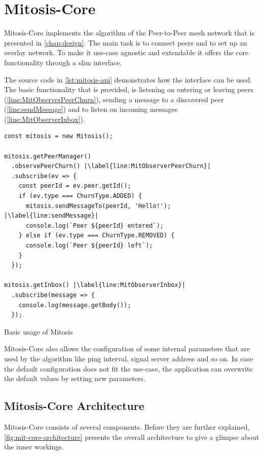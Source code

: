 \section{Mitosis-Core}
Mitosis-Core implements the algorithm of the Peer-to-Peer mesh network that is presented in \vref{chap:design}. The main task is to connect peers and to set up an overlay network. To make it use-case agnostic and extendable it offers the core functionality through a slim interface.

The source code in \vref{lst:mitosis-api} demonstrates how the interface can be used.
The basic functionality that is provided, is listening on entering or leaving peers (\cref{line:MitObserverPeerChurn}), sending a message to a discovered peer (\cref{line:sendMessage}) and to listen on incoming messages (\cref{line:MitObserverInbox}).

\begin{Listing}[htb!]
\begin{lstlisting}[basicstyle=\tiny,basicstyle=\footnotesize\ttfamily,xleftmargin=3em]
const mitosis = new Mitosis();

mitosis.getPeerManager()
  .observePeerChurn() |\label{line:MitObserverPeerChurn}|
  .subscribe(ev => {
    const peerId = ev.peer.getId();
    if (ev.type === ChurnType.ADDED) {
      mitosis.sendMessageTo(peerId, 'Hello!'); |\label{line:sendMessage}|
      console.log(`Peer ${peerId} entered`);
    } else if (ev.type === ChurnType.REMOVED) {
      console.log(`Peer ${peerId} left`);
    }
  });
  
mitosis.getInbox() |\label{line:MitObserverInbox}|
  .subscribe(message => {
    console.log(message.getBody());
  });
\end{lstlisting}
\caption{Basic usage of Mitosis}
\label{lst:mitosis-api}
\end{Listing}

Mitosis-Core also allows the configuration of some internal parameters that are used by the algorithm like ping interval, signal server address and so on. In case the default configuration does not fit the use-case, the application can overwrite the default values by setting new  parameters.

\subsection{Mitosis-Core Architecture}
Mitosis-Core consists of several components. Before they are further explained, \vref{fig:mit-core-architecture} presents the overall architecture to give a glimpse about the inner workings.


